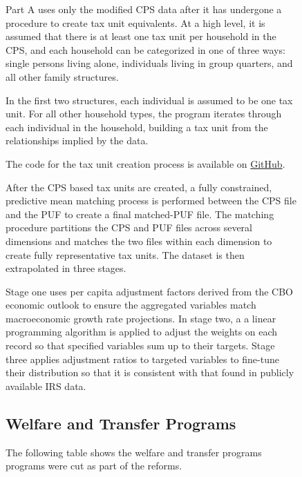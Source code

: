 \documentclass{article}
\begin{document}
\begin{figure}[H]
Part A uses only the modified CPS data after it has undergone a procedure to create tax unit equivalents. At a high level, it is assumed that there is at least one tax unit per household in the CPS, and each household can be categorized in one of three ways: single persons living alone, individuals living in group quarters, and all other family structures.

In the first two structures, each individual is assumed to be one tax unit. For all other household types, the program iterates through each individual in the household, building a tax unit from the relationships implied by the data.

The code for the tax unit creation process is available on \href{https://github.com/open-source-economics/taxdata}{GitHub}.

After the CPS based tax units are created, a fully constrained, predictive mean matching process is performed between the CPS file and the PUF to create a final matched-PUF file. The matching procedure partitions the CPS and PUF files across several dimensions and matches the two files within each dimension to create fully representative tax units. The dataset is then extrapolated in three stages.

Stage one uses per capita adjustment factors derived from the CBO economic outlook to ensure the aggregated variables match macroeconomic growth rate projections. In stage two, a a linear programming algorithm is applied to adjust the weights on each record so that specified variables sum up to their targets. Stage three applies adjustment ratios to targeted variables to fine-tune their distribution so that it is consistent with that found in publicly available IRS data.

\pagebreak
\subsection{Welfare and Transfer Programs}
The following table shows the welfare and transfer programs programs were cut as part of the reforms. 


\end{figure}
\end{document}
